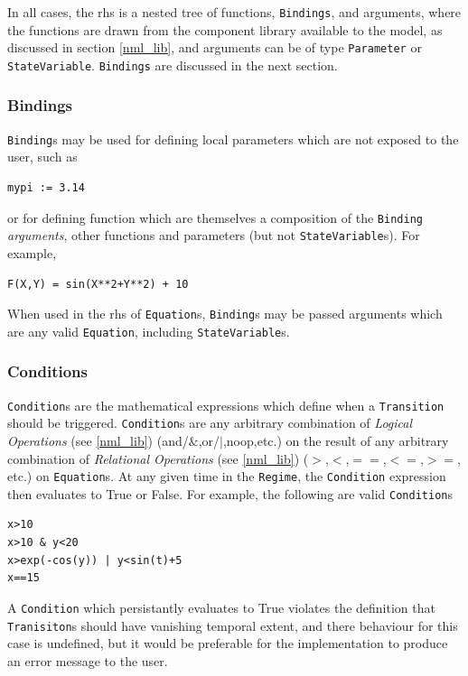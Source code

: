 \documentclass[a4paper]{article}
\newcommand\nmlClass[1]{{\tt #1}}
\begin{document}
In all cases, the rhs is a nested tree of functions, \nmlClass{Bindings}, and arguments,
where the functions are drawn from the component library available to
the model, as discussed in section \ref{nml_lib}, and arguments
can be of type \nmlClass{Parameter} or \nmlClass{StateVariable}.  \nmlClass{Bindings} are discussed in the next section.

\subsubsection{Bindings} 

\nmlClass{Binding}s may be used for defining local parameters which are not exposed to the user, such as 
\begin{lstlisting}[style=display]
mypi := 3.14
\end{lstlisting}
or for defining function which are themselves a
composition of the \nmlClass{Binding} \emph{arguments}, other functions and parameters (but not
 \nmlClass{StateVariable}s).  For example,
\begin{lstlisting}[style=display]
F(X,Y) = sin(X**2+Y**2) + 10
\end{lstlisting}
When used in the rhs of \nmlClass{Equation}s, \nmlClass{Binding}s may be passed arguments which
are any valid \nmlClass{Equation}, including \nmlClass{StateVariable}s.

\subsubsection{Conditions}

\nmlClass{Condition}s are the mathematical expressions which define
when a \nmlClass{Transition} should be triggered.
\nmlClass{Condition}s are any arbitrary combination of \emph{Logical
  Operations} (see \ref{nml_lib}) (and/$\&$,or/$|$,noop,etc.) on the
result of any arbitrary combination of \emph{Relational Operations}
(see \ref{nml_lib}) ($>$,$<$,$==$,$<=$,$>=$, etc.) on \nmlClass{Equation}s.  At
any given time in the \nmlClass{Regime}, the \nmlClass{Condition}
expression then evaluates to True or False.  For example, the
following are valid \nmlClass{Condition}s

\begin{lstlisting}[style=display]
x>10
x>10 & y<20
x>exp(-cos(y)) | y<sin(t)+5
x==15
\end{lstlisting}

A \nmlClass{Condition} which persistantly evaluates to True
violates the definition that \nmlClass{Tranisiton}s should have vanishing
temporal extent, and there behaviour for this case is undefined, but
it would be preferable for the implementation to produce an error
message to the user.
\end{document}
